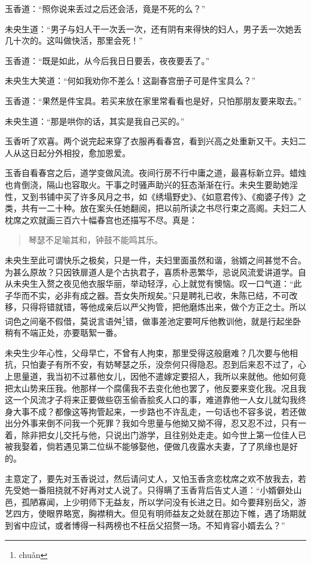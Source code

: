 \documentclass[a4paper,12pt,UTF8,twoside]{ctexbook}
\begin{document}
玉香道：“照你说来丢过之后还会活，竟是不死的么？”

未央生道：“男子与妇人干一次丢一次，还有阴有来得快的妇人，男子丢一次她丢几十次的。这叫做快活，那里会死！”

玉香道：“既是如此，从今后我日日要丢，夜夜要丢了。”

未央生大笑道：“何如我劝你不差么！这副春宫册子可是件宝具么？”

玉香道：“果然是件宝具。若买来放在家里常看看也是好，只怕那朋友要来取去。”

未央生道：“那是哄你的话，其实是我自己买的。”

玉香听了欢喜。两个说完起来穿了衣服再看春宫，看到兴高之处重新又干。夫妇二人从这日起分外相投，愈加恩爱。

玉香自看春宫之后，道学变做风流。夜间行房不行中庸之道，最喜标新立异。蜡烛也肯倒浇，隔山也容取火。干事之时骚声助兴的狂态渐渐在行。未央生要助她淫性，又到书铺中买了许多风月之书，如《绣塌野史》、《如意君传》、《痴婆子传》之类，共有一二十种。放在案头任她翻阅，把以前所读之书尽行束之高阁。夫妇二人枕席之欢就画三百六十幅春宫也还描写不尽。真是：

\begin{quotation}
琴瑟不足喻其和，钟鼓不能鸣其乐。
\end{quotation}

未央生至此可谓快乐之极矣，只是一件，夫妇里面虽然和谐，翁婿之间甚觉不合。为甚么原故？只因铁扉道人是个古执君子，喜质朴恶繁华，忌说风流爱讲道学。自从未央生入赘之夜见他衣服华丽，举动轻浮，心上就觉有懊恼。叹一口气道：“此子华而不实，必非有成之器。吾女失所规矣。”只是聘礼已收，朱陈已结，不可改移，只得将错就错，等他成亲后以严父拘管，把他磨炼出来，做个方正之士。所以词色之间毫不假借，莫说言语舛\footnote{chu\v{a}n}错，做事差池定要呵斥他教训他，就是行起坐卧稍有不端正处，亦要聒絮一番。

未央生少年心性，父母早亡，不曾有人拘束，那里受得这般磨难？几次要与他相抗，只怕妻子有所不安，有妨琴瑟之乐，没奈何只得隐忍。忍到后来忍不过了，心上思量道，我当初不过慕他女儿，因他不遣嫁定要招人，我所以来就他。他如何竟把太山势来压我。他那样一个腐儒我不去变化他也罢了，他反要来变化我。况且我这一个风流才子将来正要做些窃玉偷香脍炙人口的事，难道靠他一人女儿就勾我终身大事不成？都像这等拘管起来，一步路也不许乱走，一句话也不容多说，若还做出分外事来倒不问我一个死罪？我如今思量与他拗又拗不得，忍又忍不过，只有一着，除非把女儿交托与他，只说出门游学，且往别处走走。如今世上第一位佳人已被我娶着，倘若遇见第二位纵不能够娶他，便做几夜露水夫妻，了了夙缘也是好的。

主意定了，要先对玉香说过，然后请问丈人，又怕玉香贪恋枕席之欢不放我去，若先受她一番阻挠就不好再对丈人说了。只得瞒了玉香背后告丈人道：“小婿僻处山邑，孤陋寡闻，上少明师下无益友，所以学问没有长进之日。如今要拜别岳父，游艺四方，使眼界略宽，胸襟稍大。但见有明师益友之处就在那边下帷，遇了场期就到省中应试，或者博得一科两榜也不枉岳父招赘一场。不知肯容小婿去么？”
\end{document}
